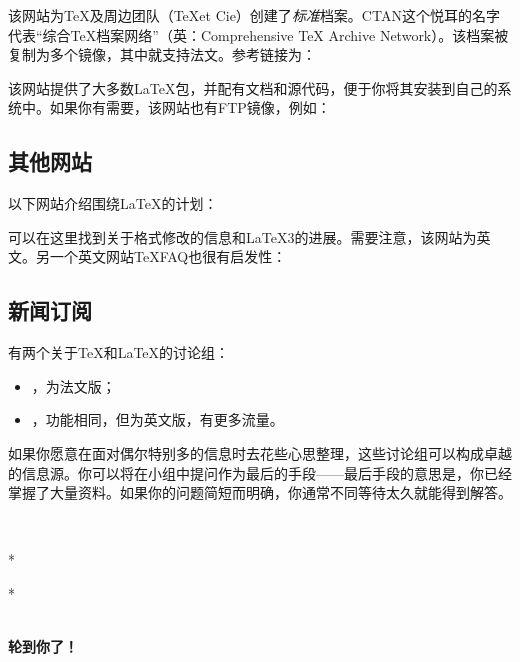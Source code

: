 该网站为\TeX 及周边团队（\TeX et Cie）创建了\emph{标准}档案。CTAN这个悦耳的名字代表“综合\TeX 档案网络”（英：Comprehensive TeX Archive Network）。该档案被复制为多个镜像，其中就支持法文。参考链接为：

\begin{dmd}
\end{dmd}

该网站提供了大多数\LaTeX 包，并配有文档和源代码，便于你将其安装到自己的系统中。如果你有需要，该网站也有FTP镜像，例如：

\begin{dmd}
\end{dmd}

\subsection{其他网站}

以下网站介绍围绕\LaTeX 的计划：

\begin{dmd}
\end{dmd}

可以在这里找到关于\LaTeXe 格式修改的信息和\LaTeX 3的进展。需要注意，该网站为英文。另一个英文网站\TeX FAQ也很有启发性：

\begin{dmd}
\end{dmd}

\subsection{新闻订阅}

有两个关于\TeX 和\LaTeX 的讨论组：

\begin{itemize}
    \item {}，为法文版；
    \item {}，功能相同，但为英文版，有更多流量。
\end{itemize}

如果你愿意在面对偶尔特别多的信息时去花些心思整理，这些讨论组可以构成卓越的信息源。你可以将在小组中提问作为最后的手段——最后手段的意思是，你已经掌握了大量资料。如果你的问题简短而明确，你通常不同等待太久就能得到解答。

~\\

\begin{center}
    *

    *\quad *

    ~\\

    \textbf{轮到你了！}
\end{center}